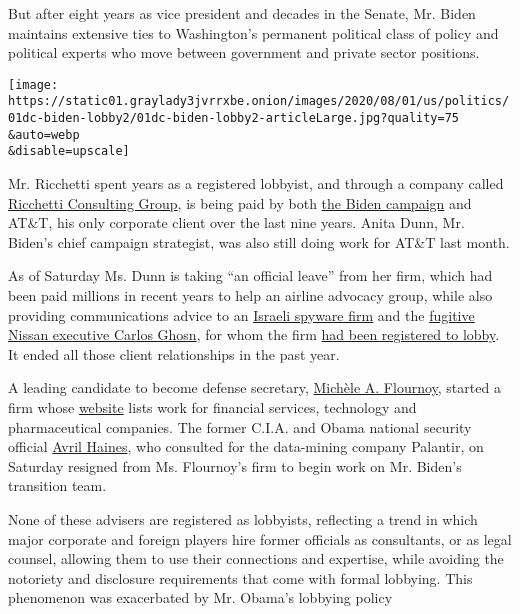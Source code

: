 But after eight years as vice president and decades in the Senate, Mr.
Biden maintains extensive ties to Washington's permanent political class
of policy and political experts who move between government and private
sector positions.

\texttt{[image: https://static01.graylady3jvrrxbe.onion/images/2020/08/01/us/politics/01dc-biden-lobby2/01dc-biden-lobby2-articleLarge.jpg?quality=75\\\&auto=webp\\\&disable=upscale]}

Mr. Ricchetti spent years as a registered lobbyist, and through a
company called
\href{https://www.documentcloud.org/documents/7010940-Biden-s-Campaign-Chairman-Formed-a-Consulting.html}{Ricchetti
Consulting Group}, is being paid by both
\href{https://docquery.fec.gov/cgi-bin/fecimg/?202007209260662530}{the
Biden campaign} and AT\&T, his only corporate client over the last nine
years. Anita Dunn, Mr. Biden's chief campaign strategist, was also still
doing work for AT\&T last month.

As of Saturday Ms. Dunn is taking ``an official leave'' from her firm,
which had been paid millions in recent years to help an airline advocacy
group, while also providing communications advice to an
\href{https://www.fastcompany.com/90326297/despite-ban-on-spyware-ads-google-allows-ad-blitz-by-hacking-firm-nso-group}{Israeli
spyware firm} and the
\href{https://www.nytimes3xbfgragh.onion/2018/12/30/business/carlos-ghosn-nissan.html}{fugitive
Nissan executive Carlos Ghosn}, for whom the firm
\href{https://soprweb.senate.gov/index.cfm?event=getFilingDetails\&filingID=55E9C7ED-A93B-4EAE-89BD-EEDE67B2C6DC\&filingTypeID=71}{had
been registered to lobby}. It ended all those client relationships in
the past year.

A leading candidate to become defense secretary,
\href{https://secure.joebiden.com/onlineactions/D4_IIHrm0UuSIFTqaXIRbg2?attr=100631128\&fbclid=IwAR28X8O4TQiVQ3h8k8NW6tTZP4JhoiaR0mVS8N0w3N0tzyKalfFUw4sraaQ}{Michèle
A. Flournoy}, started a firm whose
\href{http://westexec.com/\#about}{website} lists work for financial
services, technology and pharmaceutical companies. The former C.I.A. and
Obama national security official
\href{https://secure.joebiden.com/onlineactions/-SChB7ieakavs37tU3NAZA2?attr=100631128\&fbclid=IwAR2_qh2WkEzd-Oj-GXwD-kFly0zIfeQe1wgZdkBrOWexdi06sy11yqQiNqs}{Avril
Haines}, who consulted for the data-mining company Palantir, on Saturday
resigned from Ms. Flournoy's firm to begin work on Mr. Biden's
transition team.

None of these advisers are registered as lobbyists, reflecting a trend
in which major corporate and foreign players hire former officials as
consultants, or as legal counsel, allowing them to use their connections
and expertise, while avoiding the notoriety and disclosure requirements
that come with formal lobbying. This phenomenon was exacerbated by Mr.
Obama's lobbying policy

